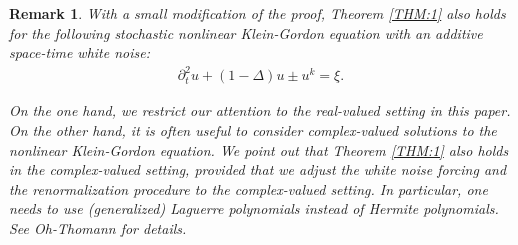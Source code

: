 \documentclass[letterpaper, 11pt,  reqno]{amsart}
\newtheorem{remark}[theorem]{Remark}
\newcommand{\1}{\hspace{0.5mm}\text{I}\hspace{0.5mm}}
\newcommand{\Dl}{\Delta}
\newcommand{\dt}{\partial_t}
\numberwithin{equation}{section}
\numberwithin{theorem}{section}
\begin{document}
\begin{remark}
\rm
	
With a small modification of the proof,  
 Theorem \ref{THM:1} also holds for 
the following stochastic nonlinear Klein-Gordon equation 
with an additive space-time white noise:	
\begin{align}
\dt^2 u  +  (1 -  \Dl)  u   \pm  u^k = \xi.
\label{SNLKG}
\end{align}


	
On the one hand,  we  restrict our attention  to the real-valued setting
in this paper.
On the other hand, it is often useful to consider complex-valued solutions
to the nonlinear Klein-Gordon equation.
We point out that
Theorem \ref{THM:1} also holds in the complex-valued setting, 
%
%
%
provided that we adjust 
the white noise forcing and 
the renormalization procedure
to the complex-valued setting.
In particular, 
one needs to use (generalized) Laguerre polynomials instead of Hermite polynomials.
See Oh-Thomann \cite{OT1} for details.
\end{remark}
\end{document}
